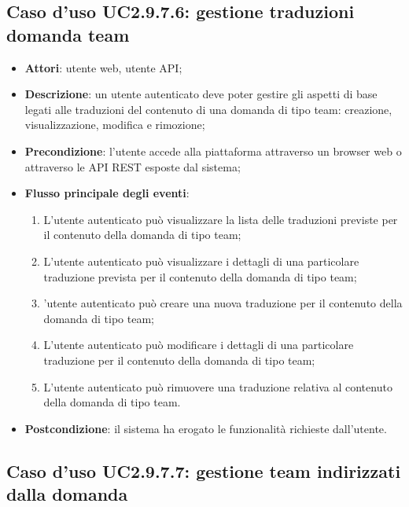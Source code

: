 \subsection{Caso d'uso UC2.9.7.6: gestione traduzioni domanda team}
\begin{itemize}
\item \textbf{Attori}: utente web, utente API;
\item \textbf{Descrizione}: un utente autenticato deve poter gestire gli aspetti di base legati alle traduzioni del contenuto di una domanda di tipo team: creazione, visualizzazione, modifica e rimozione; 
      \item \textbf{Precondizione}: l'utente accede alla piattaforma attraverso un browser web o attraverso le API REST esposte dal sistema;

        \item \textbf{Flusso principale degli eventi}:
          \begin{enumerate}
          \item L'utente autenticato può visualizzare la lista delle traduzioni previste per il contenuto della domanda di tipo team;
          \item L'utente autenticato può visualizzare i dettagli di una particolare traduzione prevista per il contenuto della domanda di tipo team;
          \item 'utente autenticato può creare una nuova traduzione per il contenuto della domanda di tipo team;
          \item L'utente autenticato può modificare i dettagli di una particolare traduzione per il contenuto della domanda di tipo team;
          \item L'utente autenticato può rimuovere una traduzione relativa al contenuto della domanda di tipo team.

      \end{enumerate}
    \item \textbf{Postcondizione}: il sistema ha erogato le funzionalità richieste dall'utente.
  \end{itemize}
\hypertarget{UC2.9.7.7}{}
\subsection{Caso d'uso UC2.9.7.7: gestione team indirizzati dalla domanda}

